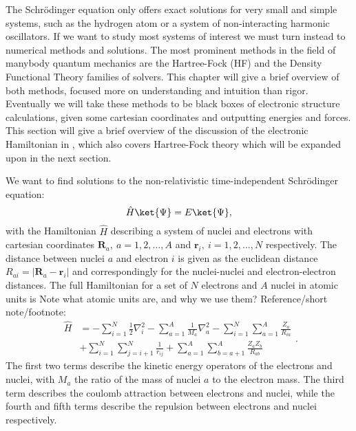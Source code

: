The Schr\"{o}dinger equation only offers exact solutions
for very small and simple systems, such as the hydrogen atom
or a system of non-interacting harmonic oscillators.
If we want to study most systems of interest we must turn
instead to numerical methods and solutions.
The most prominent methods in the field of manybody
quantum mechanics are the Hartree-Fock (HF) and the
Density Functional Theory families of solvers.
This chapter will give a brief overview of both methods,
focused more on understanding and intuition than rigor.
Eventually we will take these methods to be black boxes of
electronic structure calculations, given some cartesian
coordinates and outputting energies and forces.
This section will give a brief overview of the discussion
of the electronic Hamiltonian in \parencite[Szabo][pages 39-89]
{szabo1996modern}, which also covers Hartree-Fock theory
which will be expanded upon in the next section.
\par
We want to find solutions to the non-relativistic time-independent
Schr\"{o}dinger equation:
\begin{equation}
 \hat{H} \ket{\Psi} = E \ket{\Psi} ,
\end{equation}
with the Hamiltonian $\hat{H}$ describing a system of nuclei and electrons
with cartesian coordinates $\bm{R}_a, \ a=1,2,\dots,A$ and $\bm{r}_i, \
i=1,2,\dots,N$ respectively. The distance between nuclei $a$
and electron $i$ is given as the euclidean distance
$R_{ai} = \left| \bm{R}_a - \bm{r}_i \right|$
and correspondingly for the nuclei-nuclei and electron-electron distances.
The full Hamiltonian for a set of $N$ electrons and $A$ nuclei
in atomic units is {\color{red} Note what atomic units are, and why we use them? Reference/short note/footnote}:
\begin{equation}
    \begin{split}
        \hat{H}
        &= -\sum_{i=1}^N \frac{1}{2} \nabla_i^2
        -\sum_{a=1}^A \frac{1}{M_a} \nabla_a^2
        -\sum_{i=1}^N \sum_{a=1}^A \frac{Z_a}{R_{ia}} \\
        &+ \sum_{i=1}^N \sum_{j=i+1}^N \frac{1}{r_{ij}}
        + \sum_{a=1}^A \sum_{b=a+1}^A \frac{Z_a Z_b}{R_{ab}}
    \end{split} .
\end{equation}
The first two terms describe the kinetic energy operators
of the electrons and nuclei, with $M_a$ the ratio of the mass
of nuclei $a$ to the electron mass. The third term describes the
coulomb attraction between electrons and nuclei, while the fourth and fifth
terms describe the repulsion between electrons and nuclei respectively.
